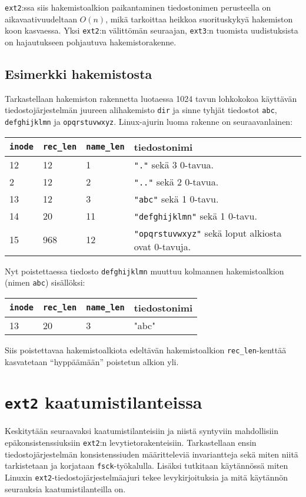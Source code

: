 \texttt{ext2}:ssa siis hakemistoalkion paikantaminen tiedostonimen perusteella on aikavaativuudeltaan $O(n)$,
mikä tarkoittaa heikkoa suorituskykyä hakemiston koon kasvaessa.
Yksi \texttt{ext2}:n välittömän seuraajan, \texttt{ext3}:n tuomista uudistuksista on hajautukseen pohjautuva hakemistorakenne.

\subsection{Esimerkki hakemistosta}
Tarkastellaan hakemiston rakennetta luotaessa 1024 tavun lohkokokoa käyttävän tiedostojärjestelmän juureen alihakemisto \texttt{dir} ja sinne tyhjät tiedostot \texttt{abc}, \texttt{defghijklmn} ja \texttt{opqrstuvwxyz}.
Linux-ajurin luoma rakenne on seuraavanlainen:

\begin{tabular}{llll}
    \texttt{inode} & \texttt{rec\_len} & \texttt{name\_len} & tiedostonimi \\ \hline
    12 & 12  & 1  & \texttt{"."}            sekä 3 0-tavua. \\
    2  & 12  & 2  & \texttt{".."}           sekä 2 0-tavua. \\
    13 & 12  & 3  & \texttt{"abc"}          sekä 1 0-tavu. \\
    14 & 20  & 11 & \texttt{"defghijklmn"}  sekä 1 0-tavu. \\
    15 & 968 & 12 & \texttt{"opqrstuvwxyz"} sekä loput alkiosta ovat 0-tavuja. \\
\end{tabular}

Nyt poistettaessa tiedosto \texttt{defghijklmn} muuttuu kolmannen hakemistoalkion (nimen \texttt{abc}) sisällöksi:

\begin{tabular}{llll}
    \texttt{inode} & \texttt{rec\_len} & \texttt{name\_len} & tiedostonimi \\ \hline
    13 & 20  & 3  & "abc"\\
\end{tabular}

Siis poistettavaa hakemistoalkiota edeltävän hakemistoalkion \texttt{rec\_len}-kenttää kasvatetaan ``hyppäämään'' poistetun alkion yli.

\section{\texttt{ext2} kaatumistilanteissa}
\label{ChapExt2Crash}
Keskitytään seuraavaksi kaatumistilanteisiin ja niistä syntyviin mahdollisiin epäkonsistenssiuksiin \texttt{ext2}:n levytietorakenteisiin.
Tarkastellaan ensin tiedostojärjestelmän konsistenssiuden määritteleviä invariantteja sekä miten niitä tarkistetaan ja korjataan \texttt{fsck}-työkalulla.
Lisäksi tutkitaan käytännössä miten Linuxin \texttt{ext2}-tiedostojärjestelmäajuri tekee levykirjoituksia ja mitä käytännön seurauksia kaatumistilanteilla on.

